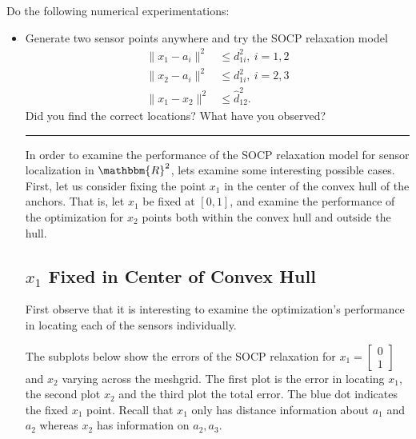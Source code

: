 \documentclass{article} %
\newcommand{\R}{\mathbbm{R}}
\begin{document}
Do the following numerical experimentations:
\begin{itemize}
\item Generate two sensor points anywhere and try the SOCP relaxation model
\[
\begin{array}{cl}
\|x_1-a_i\|^2 &\le d^2_{1i},\ i=1,2\\
\|x_2-a_i\|^2 &\le d^2_{1i},\ i=2,3\\
\|x_1-x_2\|^2&\le \hat{d}^2_{12}.
\end{array}
\]
Did you find the correct locations? What have you observed?

\rule{\textwidth}{1pt}
In order to examine the performance of the SOCP relaxation model for sensor localization in $\R^2$, lets examine some interesting possible cases. First, let us consider fixing the point $x_1$ in the center of the convex hull of the anchors. That is, let $x_1$ be fixed at $[0,1]$, and examine the performance of the optimization for $x_2$ points both within the convex hull and outside the hull. 



\subsection*{$x_1$ Fixed in Center of Convex Hull}
First observe that it is interesting to examine the optimization's performance in locating each of the sensors individually. 

The subplots below show the errors of the SOCP relaxation for $x_1 = \begin{bmatrix} 0 \\ 1 \end{bmatrix}$ and $x_2$ varying across the meshgrid. The first plot is the error in locating $x_1$, the second plot $x_2$ and the third plot  the total error. The blue dot indicates the fixed $x_1$ point. Recall that $x_1$ only has distance information about $a_1$ and $a_2$ whereas $x_2$ has information on $a_2, a_3$. 



\end{itemize}
\end{document}
